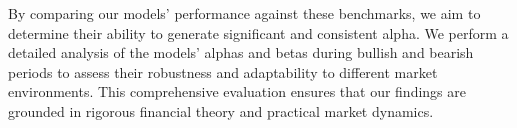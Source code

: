 \documentclass{article}
\begin{document}
By comparing our models' performance against these benchmarks, we aim to determine their ability to generate significant and consistent alpha. We perform a detailed analysis of the models' alphas and betas during bullish and bearish periods to assess their robustness and adaptability to different market environments. This comprehensive evaluation ensures that our findings are grounded in rigorous financial theory and practical market dynamics.





\end{document}
